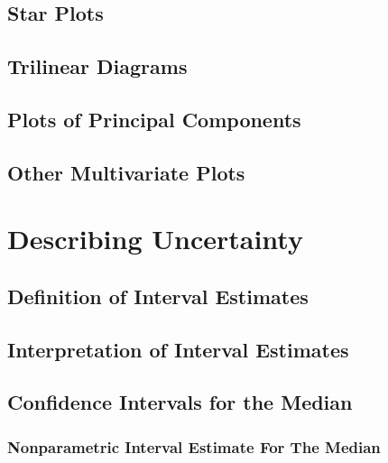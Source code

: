 \documentclass[]{book}
\begin{document}
\hypertarget{star-plots}{%
\section{Star Plots}\label{star-plots}}

\hypertarget{trilinear-diagrams}{%
\section{Trilinear Diagrams}\label{trilinear-diagrams}}

\hypertarget{plots-of-principal-components}{%
\section{Plots of Principal Components}\label{plots-of-principal-components}}

\hypertarget{other-multivariate-plots}{%
\section{Other Multivariate Plots}\label{other-multivariate-plots}}

\hypertarget{ch3}{%
\chapter{Describing Uncertainty}\label{ch3}}

\hypertarget{definition-of-interval-estimates}{%
\section{Definition of Interval Estimates}\label{definition-of-interval-estimates}}

\hypertarget{interpretation-of-interval-estimates}{%
\section{Interpretation of Interval Estimates}\label{interpretation-of-interval-estimates}}

\hypertarget{confidence-intervals-for-the-median}{%
\section{Confidence Intervals for the Median}\label{confidence-intervals-for-the-median}}

\hypertarget{nonparametric-interval-estimate-for-the-median}{%
\subsection{Nonparametric Interval Estimate For The Median}\label{nonparametric-interval-estimate-for-the-median}}
\end{document}
